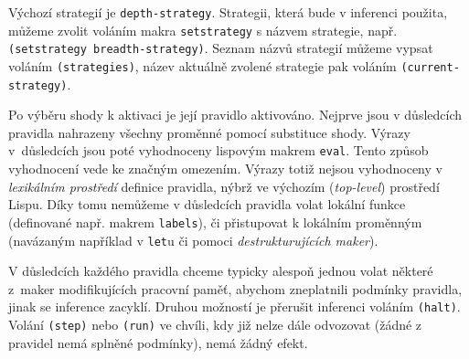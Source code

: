 Výchozí strategií je \verb|depth-strategy|. Strategii, která bude v inferenci
použita, můžeme zvolit voláním makra \verb|setstrategy| s názvem strategie,
např. \verb|(setstrategy breadth-strategy)|. Seznam názvů strategií můžeme
vypsat voláním \verb|(strategies)|, název aktuálně zvolené strategie pak voláním
\verb|(current-strategy)|.

Po výběru shody k aktivaci je její pravidlo aktivováno. Nejprve jsou v
důsledcích pravidla nahrazeny všechny proměnné pomocí substituce shody. Výrazy
v~důsledcích jsou poté vyhodnoceny lispovým makrem \verb|eval|. Tento způsob
vyhodnocení vede ke značným omezením. Výrazy totiž nejsou vyhodnoceny v
\emph{lexikálním prostředí} definice pravidla, nýbrž ve výchozím (\emph{top-level})
prostředí Lispu. Díky tomu nemůžeme v důsledcích pravidla volat lokální funkce
(definované např. makrem \verb|labels|), či přistupovat k lokálním proměnným
(navázaným například v \verb|let|u či pomoci \emph{destrukturujících maker}).

V důsledcích každého pravidla chceme typicky alespoň jednou volat některé
z~maker modifikujících pracovní paměť, abychom zneplatnili podmínky pravidla,
jinak se inference zacyklí. Druhou možností je přerušit inferenci voláním
\verb|(halt)|. Volání \verb|(step)| nebo \verb|(run)| ve chvíli, kdy již nelze
dále odvozovat (žádné z pravidel nemá splněné podmínky), nemá žádný efekt.
